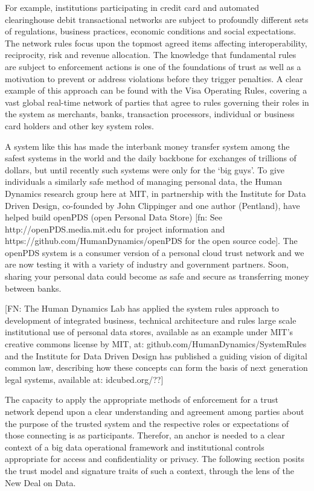 For example, institutions participating in credit card and automated clearinghouse debit transactional networks are subject to profoundly different sets of regulations, business practices, economic conditions and social expectations.
The network rules focus upon the topmost agreed items affecting interoperability, reciprocity, risk and revenue allocation.
The knowledge that fundamental rules are subject to enforcement actions is one of the foundations of trust as well as a motivation to prevent or address violations before they trigger penalties. 
A clear example of this approach can be found with the Visa Operating Rules, covering a vast global real-time network of parties that agree to rules governing their roles in the system as merchants, banks, transaction processors, individual or business card holders and other key system roles.

A system like this has made the interbank money transfer system among the safest systems in the world and the daily backbone for exchanges of trillions of dollars, but until recently such systems were only for the `big guys’.
To give individuals a similarly safe method of managing personal data, the Human Dynamics research group here at MIT, in partnership with the Institute for Data Driven Design, co-founded by John Clippinger and one author (Pentland), have helped build openPDS (open Personal Data Store) [fn: See http://openPDS.media.mit.edu for project information and https://github.com/HumanDynamics/openPDS for the open source code].
The openPDS system is a consumer version of a personal cloud trust network and we are now testing it with a variety of industry and government partners.
Soon, sharing your personal data could become as safe and secure as transferring money between banks.

[FN: The Human Dynamics Lab has applied the system rules approach to development of integrated business, technical architecture and rules large scale institutional use of personal data stores, available as an example under MIT's creative commons license by MIT, at: github.com/HumanDynamics/SystemRules and the Institute for Data Driven Design has published a guiding vision of digital common law, describing how these concepts can form the basis of next generation legal systems, available at: idcubed.org/??]

The capacity to apply the appropriate methods of enforcement for a trust network depend upon a clear understanding and agreement among parties about the purpose of the trusted system and the respective roles or expectations of those connecting is as participants.
Therefor, an anchor is needed to a clear context of a big data operational framework and institutional controls appropriate for access and confidentiality or privacy.
The following section posits the trust model and signature traits of such a context, through the lens of the New Deal on Data.

